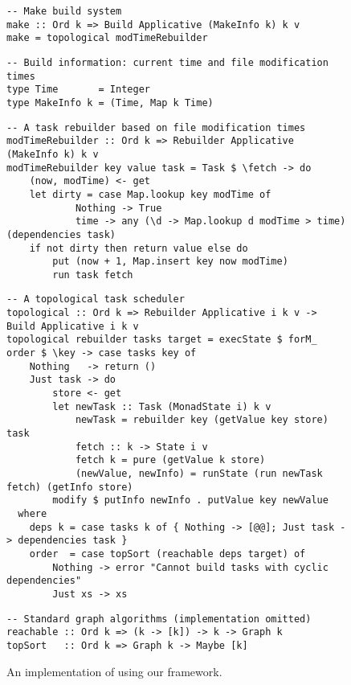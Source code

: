\begin{figure}
\begin{verbatim}
-- Make build system
make :: Ord k => Build Applicative (MakeInfo k) k v
make = topological modTimeRebuilder
\end{verbatim}
\vspace{0mm}
\begin{verbatim}
-- Build information: current time and file modification times
type Time       = Integer
type MakeInfo k = (Time, Map k Time)
\end{verbatim}
\vspace{0mm}
\begin{verbatim}
-- A task rebuilder based on file modification times
modTimeRebuilder :: Ord k => Rebuilder Applicative (MakeInfo k) k v
modTimeRebuilder key value task = Task $ \fetch -> do
    (now, modTime) <- get
    let dirty = case Map.lookup key modTime of
            Nothing -> True
            time -> any (\d -> Map.lookup d modTime > time) (dependencies task)
    if not dirty then return value else do
        put (now + 1, Map.insert key now modTime)
        run task fetch
\end{verbatim}
\vspace{0mm}
\begin{verbatim}
-- A topological task scheduler
topological :: Ord k => Rebuilder Applicative i k v -> Build Applicative i k v
topological rebuilder tasks target = execState $ forM_ order $ \key -> case tasks key of
    Nothing   -> return ()
    Just task -> do
        store <- get
        let newTask :: Task (MonadState i) k v
            newTask = rebuilder key (getValue key store) task
            fetch :: k -> State i v
            fetch k = pure (getValue k store)
            (newValue, newInfo) = runState (run newTask fetch) (getInfo store)
        modify $ putInfo newInfo . putValue key newValue
  where
    deps k = case tasks k of { Nothing -> [@@]; Just task -> dependencies task }
    order  = case topSort (reachable deps target) of
        Nothing -> error "Cannot build tasks with cyclic dependencies"
        Just xs -> xs
\end{verbatim}
\vspace{0mm}
\begin{verbatim}
-- Standard graph algorithms (implementation omitted)
reachable :: Ord k => (k -> [k]) -> k -> Graph k
topSort   :: Ord k => Graph k -> Maybe [k]
\end{verbatim}
\vspace{-2mm}
\caption{An implementation of \Make using our framework.}\label{fig-make-implementation}
\vspace{-4mm}
\end{figure}

